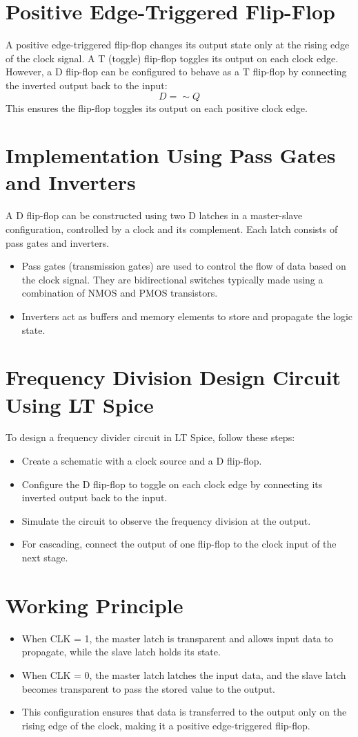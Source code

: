 \section*{Positive Edge-Triggered Flip-Flop}
A positive edge-triggered flip-flop changes its output state only at the rising edge of the clock signal. A T (toggle) flip-flop toggles its output on each clock edge. However, a D flip-flop can be configured to behave as a T flip-flop by connecting the inverted output back to the input:
\[
D = \sim Q
\]
This ensures the flip-flop toggles its output on each positive clock edge.

\section*{Implementation Using Pass Gates and Inverters}
A D flip-flop can be constructed using two D latches in a master-slave configuration, controlled by a clock and its complement. Each latch consists of pass gates and inverters.
\begin{itemize}
    \item Pass gates (transmission gates) are used to control the flow of data based on the clock signal. They are bidirectional switches typically made using a combination of NMOS and PMOS transistors.
    \item Inverters act as buffers and memory elements to store and propagate the logic state.
\end{itemize}

\section*{Frequency Division Design Circuit Using LT Spice}
To design a frequency divider circuit in LT Spice, follow these steps:
\begin{itemize}
    \item Create a schematic with a clock source and a D flip-flop.
    \item Configure the D flip-flop to toggle on each clock edge by connecting its inverted output back to the input.
    \item Simulate the circuit to observe the frequency division at the output.
    \item For cascading, connect the output of one flip-flop to the clock input of the next stage.
\end{itemize}
\section*{Working Principle}
\begin{itemize}
    \item When CLK = 1, the master latch is transparent and allows input data to propagate, while the slave latch holds its state.
    \item When CLK = 0, the master latch latches the input data, and the slave latch becomes transparent to pass the stored value to the output.
    \item This configuration ensures that data is transferred to the output only on the rising edge of the clock, making it a positive edge-triggered flip-flop.
\end{itemize}

